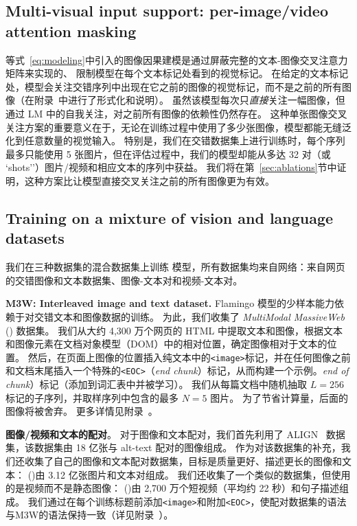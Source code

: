 \subsection{Multi-visual input support: per-image/video attention masking}
\label{sec:multi_im_att}

等式~\eqref{eq:modeling}中引入的图像因果建模是通过屏蔽完整的文本-图像交叉注意力矩阵来实现的、
限制模型在每个文本标记处看到的视觉标记。
在给定的文本标记处，模型会关注交错序列中出现在它之前的图像的视觉标记，而不是之前的所有图像（在附录~中进行了形式化和说明）。
虽然该模型每次只\textit{直接}关注一幅图像，但通过 LM 中的自我关注，对之前所有图像的依赖性仍然存在。
这种单张图像交叉关注方案的重要意义在于，无论在训练过程中使用了多少张图像，模型都能无缝泛化到任意数量的视觉输入。
特别是，我们在交错数据集上进行训练时，每个序列最多只能使用 5 张图片，但在评估过程中，我们的模型却能从多达 32 对（或 `shots''）图片/视频和相应文本的序列中获益。
我们将在第~\ref{sec:ablations}节中证明，这种方案比让模型直接交叉关注之前的所有图像更为有效。



\subsection{Training on a mixture of vision and language datasets}
\label{sec:datasets}\label{sec:training}


我们在三种数据集的混合数据集上训练 \method{} 模型，所有数据集均来自网络：来自网页的交错图像和文本数据集、图像-文本对和视频-文本对。


\textbf{M3W: Interleaved image and text dataset.}
\label{sec:interleaved_datasets}
Flamingo 模型的少样本能力依赖于对交错文本和图像数据的训练。
为此，我们收集了 \emph{MultiModal MassiveWeb} (\mmmw) 数据集。
我们从大约 4,300 万个网页的 HTML 中提取文本和图像，根据文本和图像元素在文档对象模型（DOM）中的相对位置，确定图像相对于文本的位置。
然后，在页面上图像的位置插入纯文本中的\texttt{<image>}标记，并在任何图像之前和文档末尾插入一个特殊的\texttt{<EOC>}（\textit{end chunk}）标记，从而构建一个示例。\textit{end of chunk}）标记（添加到词汇表中并被学习）。
我们从每篇文档中随机抽取 $L=256$ 标记的子序列，并取样序列中包含的最多 $N=5$ 图片。
为了节省计算量，后面的图像将被舍弃。
更多详情见附录~。

\textbf{图像/视频和文本的配对}。
对于图像和文本配对，我们首先利用了 ALIGN~\citep{align} 数据集，该数据集由 18 亿张与 alt-text 配对的图像组成。
作为对该数据集的补充，我们还收集了自己的图像和文本配对数据集，目标是质量更好、描述更长的图像和文本：  \shortimagetextpairs{} (\imagetextpairs)由 3.12 亿张图片和文本对组成。
我们还收集了一个类似的数据集，但使用的是视频而不是静态图像： \shortvideotextpairs(\videotextpairs)由 2,700 万个短视频（平均约 22 秒）和句子描述组成。
我们通过在每个训练标题前添加\texttt{<image>}和附加\texttt{<EOC>}，使配对数据集的语法与M3W的语法保持一致（详见附录~）。

